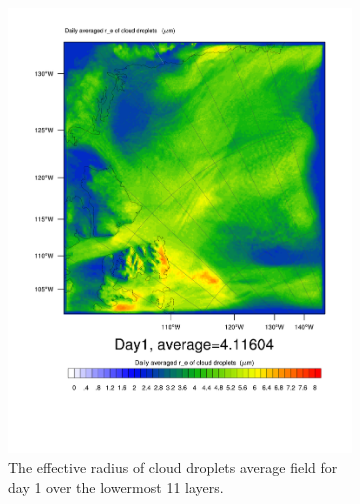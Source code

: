 \begin{figure}[h]
\centering
	\begin{subfigure}{0.48\textwidth}
		\centering
		\includegraphics[width=\textwidth]{results/control/RE_CLOUD_Day1.pdf}
		\caption{The effective radius of cloud droplets average field for day 1 over the lowermost 11 layers.}
		\label{subfig:recloud_r1Day1}
	\end{subfigure}
	\begin{subfigure}{0.48\textwidth}
		\centering

\end{subfigure}
\end{figure}
